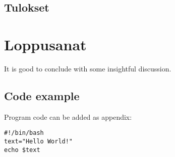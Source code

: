 \documentclass[finnish,twoside,openright]{HYgraduMLDS}
\begin{document}
\section{Tulokset}


\chapter{Loppusanat\label{chapter:Loppusanat}}

It is good to conclude with some insightful discussion. 


\cleardoublepage %



\begin{appendices}
\myappendixtitle

\chapter{Code example\label{appendix:code}}
Program code can be added as appendix:
\begin{verbatim}
#!/bin/bash          
text="Hello World!"
echo $text
\end{verbatim}

\end{appendices}
\end{document}
